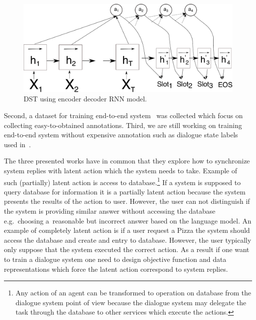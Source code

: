 \documentclass[11pt]{article}
\begin{document}
\begin{figure}[htpb]
    \centering
    \includegraphics[width=1.0\linewidth]{dst_seq2seq}
    \caption{DST using encoder decoder RNN model.}
    \label{fig:dst_seq2seq}
\end{figure}

Second, a dataset for training end-to-end system~\cite{platek2016wochat} was collected which focus on collecting easy-to-obtained annotations.
Third, we are still working on training end-to-end system without expensive annotation such as dialogue state labels used in~\cite{wen_networkbased_2016}.

The three presented works have in common that they explore how to synchronize system replies with latent action which the system needs to take.
Example of such (partially) latent action is access to database.\footnote{Any action of an agent can be transformed to operation on database from the dialogue system point of view because the dialogue system may delegate the task through the database to other services which execute the actions.}
If a system is supposed to query database for information it is a partially latent action because the system presents the results of the action to user.
However, the user can not distinguish if the system is providing similar answer without accessing the database e.g.~choosing a~reasonable but incorrect answer based on the language model.
An example of completely latent action is if a user request a Pizza the system should access the database and create and entry to database.
However, the user typically only suppose that the system executed the correct action.
As a result if one want to train a dialogue system one need to design objective function and data representations which force the latent action correspond to system replies.
\end{document}
